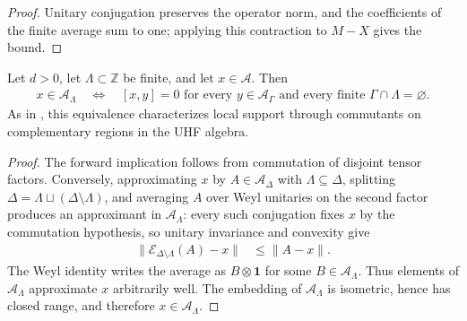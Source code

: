 \begin{proof}\leanok
    Unitary conjugation preserves the operator norm, and the coefficients of the
    finite average sum to one; applying this contraction to $M-X$ gives the bound.
\end{proof}

\begin{lemma}
    \label{thm:qca_quasi_local_supported_iff_commute_disjoint}
    \leanok
    Let $d>0$, let $\Lambda\subset\mathbb Z$ be finite, and let
    $x\in\mathcal A$.  Then
    \begin{align}
        x\in\mathcal A_\Lambda
        \quad\Longleftrightarrow\quad
        [x,y]=0
        \text{ for every }y\in\mathcal A_\Gamma
        \text{ and every finite }\Gamma\cap\Lambda=\varnothing.
    \end{align}
    As in \cite{Cirac2017MPU,SchumacherWerner2004QCA}, this equivalence characterizes local support through commutants on complementary
    regions in the UHF algebra.
\end{lemma}

\begin{proof}\leanok
    The forward implication follows from commutation of disjoint tensor factors.
    Conversely, approximating $x$ by $A\in\mathcal A_\Delta$ with
    $\Lambda\subseteq\Delta$, splitting
    $\Delta=\Lambda\sqcup(\Delta\setminus\Lambda)$, and averaging $A$ over Weyl
    unitaries on the second factor produces an approximant in $\mathcal A_\Lambda$: every such conjugation fixes $x$ by the
    commutation hypothesis, so unitary invariance and convexity give
    \begin{align}
        \lVert\mathcal E_{\Delta\setminus\Lambda}(A)-x\rVert
         & \le \lVert A-x\rVert.
    \end{align}
    The Weyl identity writes the average as $B\otimes\mathbf 1$ for some
    $B\in\mathcal A_\Lambda$.  Thus elements of $\mathcal A_\Lambda$ approximate
    $x$ arbitrarily well.  The embedding of $\mathcal A_\Lambda$ is isometric,
    hence has closed range, and therefore $x\in\mathcal A_\Lambda$.
\end{proof}

